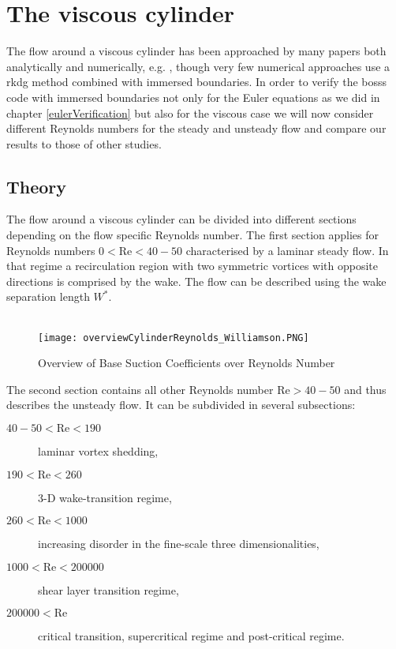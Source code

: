 \chapter{The viscous cylinder}
The flow around a viscous cylinder has been approached by many papers both analytically  and numerically, e.g. , though very few numerical approaches use a \gls{rkdg} method combined with immersed boundaries. In order to verify the \gls{bosss} code with immersed boundaries not only for the Euler equations as we did in chapter \ref{eulerVerification} but also for the viscous case we will now consider different Reynolds numbers for the steady and unsteady flow and compare our results to those of other studies.

\section{Theory}
	The flow around a viscous cylinder can be divided into different sections depending on the flow specific Reynolds number. The first section applies for Reynolds numbers $0 < \text{Re} < 40-50$ characterised by a laminar steady flow. In that regime a recirculation region with two symmetric vortices with opposite directions is comprised by the wake. The flow can be described using the wake separation length $W^*$.\\\\
	\begin{figure}[htp]
		\centering
		\texttt{[image: overviewCylinderReynolds\_Williamson.PNG]}
		\caption{Overview of Base Suction Coefficients over Reynolds Number }
		\label{fig:overview}
	\end{figure} 
	The second section contains all other Reynolds number $\text{Re}> 40-50$ and thus describes the unsteady flow. It can be subdivided in several subsections:
	\begin{description}
		\item[$40-50 < \text{Re} < 190$] laminar vortex shedding,
		\item[$190 < \text{Re} < 260$] 3-D wake-transition regime,
		\item[$260 < \text{Re} < 1000$] increasing disorder in the fine-scale three dimensionalities,
		\item[$1000 < \text{Re} < 200000$] shear layer transition regime,
		\item[$200000 < \text{Re}$] critical transition, supercritical regime and post-critical regime.
	\end{description}
	
